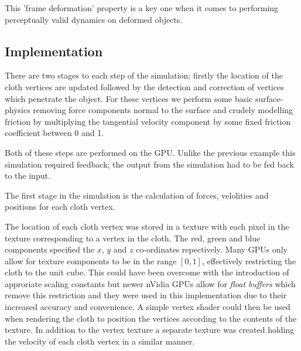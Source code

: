 This 'frame deformation' property is a key one when it comes to performing perceptually
valid dynamics on deformed objects.


\subsection{Implementation}

There are two stages to each step of the simulation; firstly the location of
the cloth vertices are updated followed by the detection and correction of
vertices which penetrate the object. For these vertices we perform some basic
surface-physics removing force components normal to the surface and crudely
modelling friction by multiplying the tangential velocity component by some
fixed friction coefficient between 0 and 1.

Both of these steps are performed on the GPU. Unlike the previous example this
simulation required feedback; the output from the simulation had to be fed back
to the input.


The first stage in the simulation is the calculation of forces, velolities
and positions for each cloth vertex. 

The location of each cloth vertex was stored in a texture with each pixel in the
texture corresponding to a vertex in the cloth. The red, green and blue
components specified the $x$, $y$ and $z$ co-ordinates repectively.  Many GPUs
only allow for texture components to be in the range $[0, 1]$, effectively
restricting the cloth to the unit cube. This could have been overcome with the
introduction of approriate scaling constants but newer nVidia GPUs allow for
\emph{float buffers} which remove this restriction and they were used in this
implementation due to their increased accuracy and convenience. A simple vertex shader
could then be used when rendering the cloth to position the vertices according to the
contents of the texture.
In addition to the vertex texture a separate texture was created holding the 
velocity of each cloth vertex in a similar manner. 

